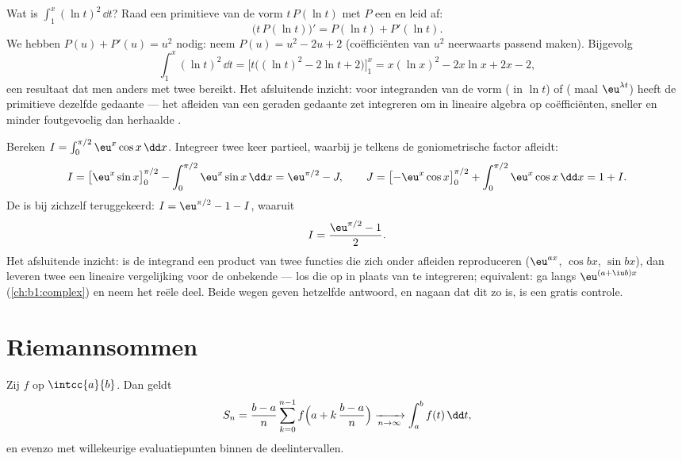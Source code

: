 \begin{example}\label{ex:b1:integration:guessdiff}
Wat is $\int_1^x (\ln t)^2\,\dd t$? Raad een primitieve van de
vorm $t\,P(\ln t)$ met $P$ een  en leid af:
\[
\bigl(t\,P(\ln t)\bigr)' = P(\ln t) + P'(\ln t) .
\]
We hebben $P(u) + P'(u) = u^2$ nodig: neem $P(u) = u^2 - 2u + 2$
(coëfficiënten van $u^2$ neerwaarts passend maken). Bijgevolg
\[
\int_1^x (\ln t)^2\,\dd t
= \bigl[t\bigl((\ln t)^2 - 2\ln t + 2\bigr)\bigr]_1^x
= x(\ln x)^2 - 2x\ln x + 2x - 2 ,
\]
een resultaat dat men anders met twee 
bereikt. Het afsluitende inzicht: voor integranden van de vorm
( in $\ln t$) of ( maal $\eu^{\lambda t}$) heeft
de primitieve dezelfde gedaante --- het afleiden van een geraden
gedaante zet integreren om in lineaire algebra op coëfficiënten,
sneller en minder foutgevoelig dan herhaalde .
\end{example}

\begin{example}[De boemerangintegraal]\label{ex:b1:integration:boomerang}
Bereken $I = \int_0^{\pi/2} \eu^x \cos x\,\dd x$. Integreer twee
keer partieel, waarbij je telkens de goniometrische factor
afleidt:
\[
I = \bigl[\eu^x \sin x\bigr]_0^{\pi/2}
- \int_0^{\pi/2} \eu^x \sin x\,\dd x
= \eu^{\pi/2} - J,
\qquad
J = \bigl[-\eu^x\cos x\bigr]_0^{\pi/2}
+ \int_0^{\pi/2} \eu^x\cos x\,\dd x = 1 + I .
\]
De  is bij zichzelf teruggekeerd: $I = \eu^{\pi/2} - 1 -
I$, waaruit
\[
I = \frac{\eu^{\pi/2} - 1}{2} .
\]
Het afsluitende inzicht: is de integrand een product van twee
functies die zich onder afleiden reproduceren ($\eu^{ax}$, $\cos
bx$, $\sin bx$), dan leveren twee  een
lineaire vergelijking voor de onbekende  --- los die op
in plaats van te integreren; equivalent: ga langs $\eu^{(a + \iu
b)x}$ (\cref{ch:b1:complex}) en neem het reële deel. Beide wegen
geven hetzelfde antwoord, en nagaan dat dit zo is, is een gratis
controle.
\end{example}

\section{Riemannsommen}

\begin{theorem}[Riemannsommen]\label{thm:b1:integration:riemann}
Zij $f$  op $\intcc{a}{b}$. Dan
geldt
\[
S_n = \frac{b - a}{n} \sum_{k=0}^{n-1}
f\Bigl(a + k\,\frac{b-a}{n}\Bigr)
\xrightarrow[n \to \infty]{} \int_a^b f(t)\, \dd t ,
\]
en evenzo met willekeurige evaluatiepunten binnen de
deelintervallen.
\end{theorem}

